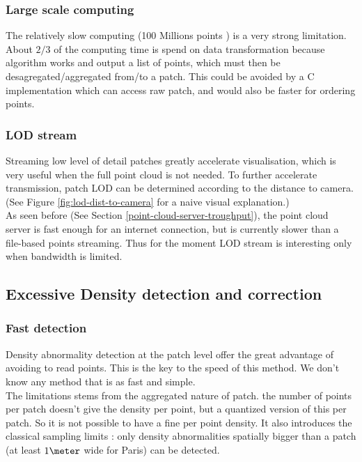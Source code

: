 	 \subsubsection{Large scale computing} 
		 The relatively slow computing (100 Millions points \per \second ) is a very strong limitation.
		 About $2/3$ of the computing time is spend on data transformation because algorithm works and output a list of points, which must then be desagregated/aggregated from/to a patch.
		 This could be avoided by a C implementation which can access raw patch, and would also be faster for ordering points.
		 
	 \subsubsection{LOD stream}
		 Streaming low level of detail patches greatly accelerate visualisation,
		 which is very useful when the full point cloud is not needed.
		 To further accelerate transmission, patch LOD can be determined according to the distance to camera. (See Figure \ref{fig:lod-dist-to-camera} for a naive visual explanation.)
		 \\
		 As seen before (See Section \ref{point-cloud-server-troughput}), the point cloud server is fast enough for an internet connection, but is currently slower than a file-based points streaming. Thus for the moment LOD stream is interesting only when bandwidth is limited.
	
	\subsection{Excessive Density detection and correction}
		\subsubsection{Fast detection}
		Density abnormality detection at the patch level offer the great advantage of avoiding to read points. This is the key to the speed of this method. We don't know any method that is as fast and simple.
		\\
		The limitations stems from the aggregated nature of patch. the number of points per patch doesn't give the density per point, but a quantized version of this per patch.
		So it is not possible to have a fine per point density.
		It also introduces the classical sampling limits : only density abnormalities spatially bigger than a patch  (at least $1 \meter$ wide for Paris) can be detected.
		
